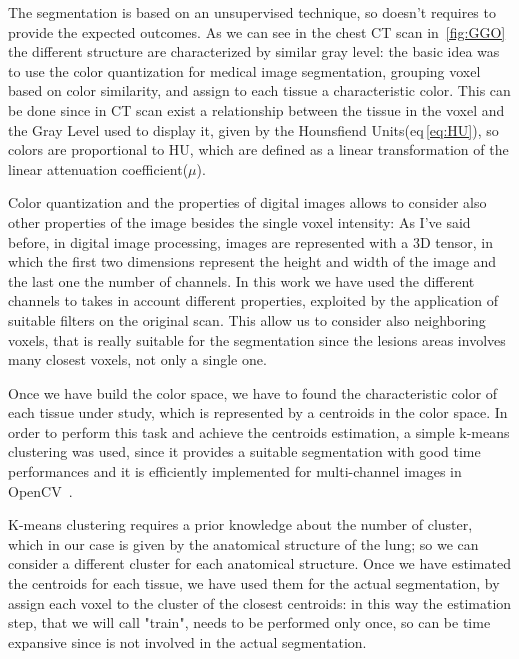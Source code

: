 	The segmentation is based on an unsupervised technique, so doesn't requires to provide the expected outcomes.
	As we can see in the chest CT scan in \figurename\,\ref{fig:GGO} the different structure are characterized by similar gray level: the basic idea was to use the color quantization for medical image segmentation, grouping voxel based on color similarity, and  assign  to each tissue a characteristic color. This can be done since in CT scan exist a relationship between the tissue in the voxel and the Gray Level used to display it, given by the Hounsfiend Units(eq\,\ref{eq:HU}), so colors are proportional to HU, which are defined as a linear transformation of the linear attenuation coefficient($\mu$).
		
	Color quantization and the properties of digital images allows to consider also other properties of the image besides the single voxel intensity:
	As I've said before, in digital image processing, images are represented with a 3D tensor, in which the first two dimensions represent the height and width of the image  and the last one the number of channels. 
	In this work we have used the different channels to takes in account different properties, exploited by the application of suitable filters on the original scan. This allow us to consider also neighboring voxels, that is really suitable for the segmentation since the  lesions areas involves many closest voxels, not only a single one. 
	
	Once we have build the color space, we have to found the characteristic color of each tissue under study, which is represented by a centroids in the color space. In order to perform this task and achieve the centroids estimation, a simple k-means clustering was used, since it provides a suitable segmentation with good time performances and it is efficiently implemented for multi-channel images in \textsf{OpenCV}~\cite{OpenCV}.
	 
	K-means clustering requires a prior knowledge about the number of cluster, which in our case is given by the anatomical structure of the lung; so we can consider a different cluster for each anatomical structure.
	Once we have estimated the centroids for each tissue, we have used them for the actual segmentation, by assign each voxel to the cluster of the closest centroids: in this way the estimation step, that we will call "train", needs to be performed only once, so can be time expansive since is not involved in the actual segmentation.\\
	
